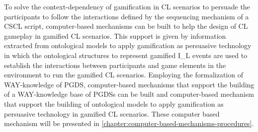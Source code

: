 To solve the context-dependency of gamification in CL scenarios to persuade the participants to follow the interactions defined by the sequencing mechanism of a CSCL script, computer-based mechanisms can be built to help the design of CL gameplay in gamified CL scenarios.
This support is given by information extracted from ontological models to apply gamification as persuasive technology in which the ontological structures to represent gamified I\_L events are used to establish the interactions between participants and game elements in the environment to run the gamified CL scenarios.
Employing the formalization of WAY-knowledge of PGDS, computer-based mechanisms that support the building of a WAY-knowledge base of PGDSs can be built and computer-based mechanism that support the building of ontological models to apply gamification as persuasive technology in gamified CL scenarios.
These computer based mechanism will be presented in \autoref{chapter:computer-based-mechanisms-procedures}. 
